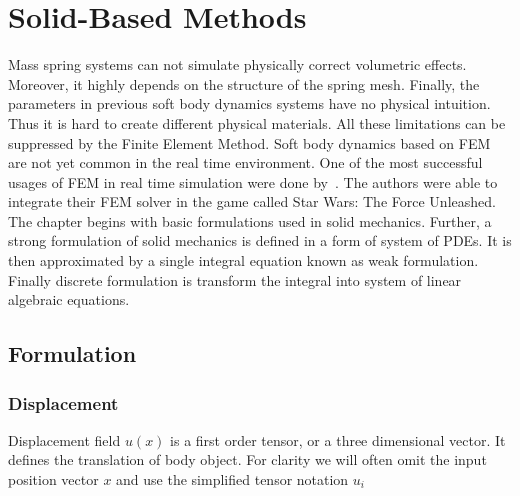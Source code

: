 \documentclass[en]{minipw} %
\begin{document}
\chapter{Solid-Based Methods}
\label{chap:solid_mechanics1}

Mass spring systems can not simulate physically correct volumetric effects. Moreover, it highly depends on the structure of the spring mesh. Finally, the parameters in previous soft body dynamics systems have no physical intuition. Thus it is hard to create different physical materials. All these limitations can be suppressed by the Finite Element Method. Soft body dynamics based on FEM are not yet common in the real time environment. One of the most successful usages of FEM in real time simulation were done by~\cite{parker}. The authors were able to integrate their FEM solver in the game called Star Wars: The Force Unleashed. The chapter begins with basic formulations used in solid mechanics. Further, a strong formulation of solid mechanics is defined in a form of system of PDEs. It is then approximated by a single integral equation known as weak formulation. Finally discrete formulation is transform the integral into system of linear algebraic equations. 

\section{Formulation}
\subsection{Displacement}
Displacement field $u(x)$ is a first order tensor, or a three dimensional vector. It defines the translation of body object. For clarity we will often omit the input position vector $x$ and use the simplified tensor notation $u_i$
\end{document}
